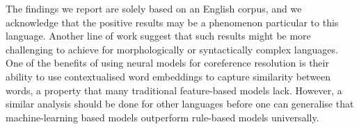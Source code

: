 \documentclass[11pt]{article}
\begin{document}

The findings we report are solely based on an English corpus, and we acknowledge that the positive results may be a phenomenon particular to this language. Another line of work \parencite{russian,other-lang} suggest that such results might be more challenging to achieve for morphologically or syntactically complex languages. One of the benefits of using neural models for coreference resolution is their ability to use contextualised word embeddings to capture similarity between words, a property that many traditional feature-based models lack. However, a similar analysis should be done for other languages before one can generalise that machine-learning based models outperform rule-based models universally.


\end{document}
